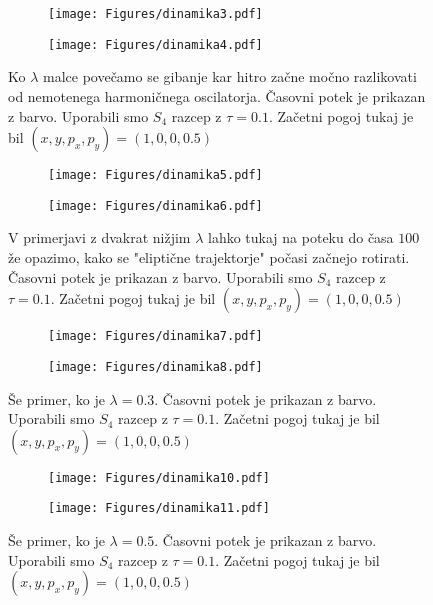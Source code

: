\documentclass{article}
\begin{document}
\begin{figure}[H]
\centering
\begin{subfigure}{.49\textwidth}
\texttt{[image: Figures/dinamika3.pdf]}
\end{subfigure}
\begin{subfigure}{.49\textwidth}
\texttt{[image: Figures/dinamika4.pdf]}
\end{subfigure}
\caption*{Ko $\lambda$ malce povečamo se gibanje kar hitro začne močno razlikovati od nemotenega harmoničnega oscilatorja. Časovni potek je prikazan z barvo. Uporabili smo $S_4$ razcep z $\tau=0.1$. Začetni pogoj tukaj je bil $(x,y,p_x,p_y) = (1,0,0,0.5)$}
\end{figure}

\begin{figure}[H]
\centering
\begin{subfigure}{.49\textwidth}
\texttt{[image: Figures/dinamika5.pdf]}
\end{subfigure}
\begin{subfigure}{.49\textwidth}
\texttt{[image: Figures/dinamika6.pdf]}
\end{subfigure}
\caption*{V primerjavi z dvakrat nižjim $\lambda$ lahko tukaj na poteku do časa $100$ že opazimo, kako se "eliptične trajektorje" počasi začnejo rotirati. Časovni potek je prikazan z barvo. Uporabili smo $S_4$ razcep z $\tau=0.1$. Začetni pogoj tukaj je bil $(x,y,p_x,p_y) = (1,0,0,0.5)$}
\end{figure}

\begin{figure}[H]
\centering
\begin{subfigure}{.49\textwidth}
\texttt{[image: Figures/dinamika7.pdf]}
\end{subfigure}
\begin{subfigure}{.49\textwidth}
\texttt{[image: Figures/dinamika8.pdf]}
\end{subfigure}
\caption*{Še primer, ko je $\lambda= 0.3$. Časovni potek je prikazan z barvo. Uporabili smo $S_4$ razcep z $\tau=0.1$. Začetni pogoj tukaj je bil $(x,y,p_x,p_y) = (1,0,0,0.5)$}
\end{figure}

\begin{figure}[H]
\centering
\begin{subfigure}{.49\textwidth}
\texttt{[image: Figures/dinamika10.pdf]}
\end{subfigure}
\begin{subfigure}{.49\textwidth}
\texttt{[image: Figures/dinamika11.pdf]}
\end{subfigure}
\caption*{Še primer, ko je $\lambda= 0.5$. Časovni potek je prikazan z barvo. Uporabili smo $S_4$ razcep z $\tau=0.1$. Začetni pogoj tukaj je bil $(x,y,p_x,p_y) = (1,0,0,0.5)$}
\end{figure}
\end{document}
